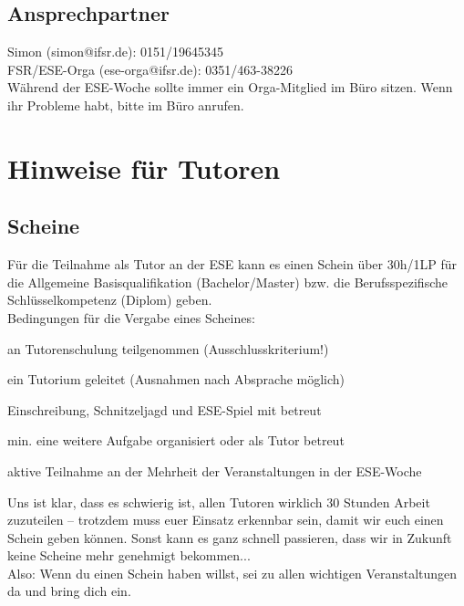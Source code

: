 \documentclass[a4paper,12pt]{report}
\begin{document}
\section*{Ansprechpartner}
Simon (simon@ifsr.de): 0151/19645345\\
FSR/ESE-Orga (ese-orga@ifsr.de): 0351/463-38226 \\

Während der ESE-Woche sollte immer ein Orga-Mitglied im Büro sitzen. Wenn ihr Probleme habt, bitte im Büro anrufen.

\tableofcontents
\chapter{Hinweise für Tutoren}
\section{Scheine}
Für die Teilnahme als Tutor an der ESE kann es einen Schein über 30h/1LP für die Allgemeine Basisqualifikation (Bachelor/Master) bzw. die Berufsspezifische Schlüsselkompetenz (Diplom) geben.\\
Bedingungen für die Vergabe eines Scheines:
\begin{itemize*}
	\item an Tutorenschulung teilgenommen (Ausschlusskriterium!)
	\item ein Tutorium geleitet (Ausnahmen nach Absprache möglich)
	\item Einschreibung, Schnitzeljagd und ESE-Spiel mit betreut
	\item min. eine weitere Aufgabe organisiert oder als Tutor betreut
	\item aktive Teilnahme an der Mehrheit der Veranstaltungen in der ESE-Woche
\end{itemize*}
Uns ist klar, dass es schwierig ist, allen Tutoren wirklich 30 Stunden Arbeit zuzuteilen -- trotzdem muss euer Einsatz erkennbar sein, damit wir euch einen Schein geben können. Sonst kann es ganz schnell passieren, dass wir in Zukunft keine Scheine mehr genehmigt bekommen...\\
Also: Wenn du einen Schein haben willst, sei zu allen wichtigen Veranstaltungen da und bring dich ein.
\end{document}
